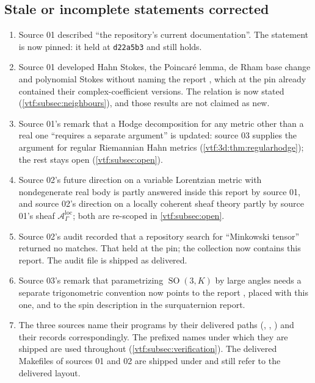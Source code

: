 \documentclass[11pt,letterpaper]{article}
\theoremstyle{definition}
\theoremstyle{remark}
\newcommand{\A}{\mathscr A}\newcommand{\OO}{\mathcal O}\newcommand{\mm}{\mathfrak m}
\newcommand{\SO}{\operatorname{SO}}\newcommand{\SL}{\operatorname{SL}}
\begin{document}
\subsection{Stale or incomplete statements corrected}\label{vtf:subsec:stale}

\begin{enumerate}
\item Source 01 described ``the repository's current documentation''. The
statement is now pinned: it held at \texttt{d22a5b3} and still holds.
\item Source 01 developed Hahn Stokes, the Poincar\'e lemma, de Rham base change
and polynomial Stokes without naming the report
, which at the pin already contained
their complex-coefficient versions. The relation is now stated
(\cref{vtf:subsec:neighbours}), and those results are not claimed as new.
\item Source 01's remark that a Hodge decomposition for any metric other than a
real one ``requires a separate argument'' is updated: source 03 supplies the
argument for regular Riemannian Hahn metrics (\cref{vtf:3d:thm:regularhodge});
the rest stays open (\cref{vtf:subsec:open}).
\item Source 02's future direction on a variable Lorentzian metric with
nondegenerate real body is partly answered inside this report by source 01, and
source 02's direction on a locally coherent sheaf theory partly by source 01's
sheaf $\A^{\mathrm{loc}}_\Gamma$; both are re-scoped in \cref{vtf:subsec:open}.
\item Source 02's audit recorded that a repository search for ``Minkowski
tensor'' returned no matches. That held at the pin; the collection now contains
this report. The audit file is shipped as delivered.
\item Source 03's remark that parametrizing $\SO(3,K)$ by large angles needs a
separate trigonometric convention now points to the report
, placed with this one, and to the spin
description in the surquaternion report.
\item The three sources name their programs by their delivered paths
(, ,
) and their records correspondingly. The prefixed names
under which they are shipped are used throughout
(\cref{vtf:subsec:verification}). The delivered Makefiles of sources 01 and 02
are shipped under  and still refer to the delivered layout.
\end{enumerate}
\end{document}

